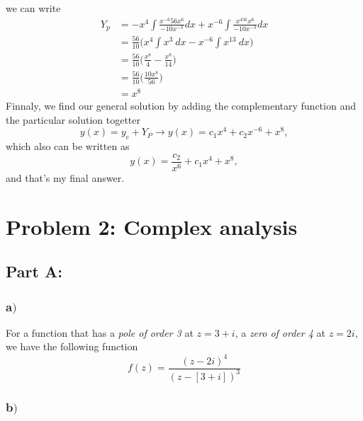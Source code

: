 \documentclass{article}
\begin{document}
we can write
\begin{align}
Y_p &= -x^4 \int \frac{x^{-6}56x^6}{-10x^{-3}}dx + x^{-6} \int \frac{x^456x^6}{-10x^{-3}}dx \\
 &= \frac{56}{10}\bigg(x^4 \int x^3 \ dx - x^{-6} \int x^{13} \ dx \bigg) \\
 &= \frac{56}{10}\bigg(\frac{x^8}{4} - \frac{x^{8}}{14}\bigg) \\
 &= \frac{56}{10}\bigg(\frac{10x^8}{56}\bigg) \\
 &= x^8
\end{align}
Finnaly, we find our general solution by adding the complementary function and the particular solution togetter
\begin{equation}
y(x) = y_c + Y_P \rightarrow y(x) = c_1x^4 + c_2x^{-6} + x^8,
\end{equation}
which also can be written as
\begin{equation}
y(x) = \frac{c_2}{x^{6}} + c_1x^4 + x^8,
\end{equation}
and that's my final answer.

\section*{Problem 2: Complex analysis}

\subsection*{Part A:}

\subsubsection*{a$)$}

For a function that has a \textit{pole of order 3} at $z = 3 + i$, a \textit{zero of order 4} at $z = 2i$, we have the following function 
\begin{equation}
f(z) = \frac{(z-2i)^4}{(z-[3+i])^3}
\end{equation}

\subsubsection*{b$)$}
\end{document}
